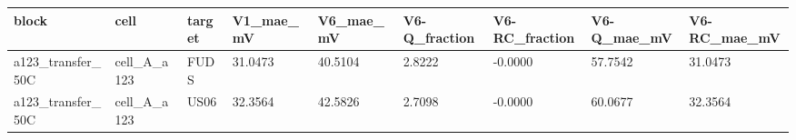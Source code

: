 \begin{tabular}{lllllllll}
\hline
block & cell & target & V1\_mae\_mV & V6\_mae\_mV & V6-Q\_fraction & V6-RC\_fraction & V6-Q\_mae\_mV & V6-RC\_mae\_mV \\
\hline
a123\_transfer\_50C & cell\_A\_a123 & FUDS & 31.0473 & 40.5104 & 2.8222 & -0.0000 & 57.7542 & 31.0473 \\
a123\_transfer\_50C & cell\_A\_a123 & US06 & 32.3564 & 42.5826 & 2.7098 & -0.0000 & 60.0677 & 32.3564 \\
\hline
\end{tabular}
